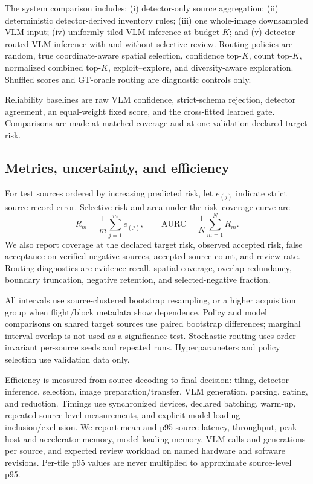 The system comparison includes: (i) detector-only source aggregation; (ii) deterministic detector-derived inventory rules; (iii) one whole-image downsampled VLM input; (iv) uniformly tiled VLM inference at budget $K$; and (v) detector-routed VLM inference with and without selective review. Routing policies are random, true coordinate-aware spatial selection, confidence top-$K$, count top-$K$, normalized combined top-$K$, exploit--explore, and diversity-aware exploration. Shuffled scores and GT-oracle routing are diagnostic controls only.

Reliability baselines are raw VLM confidence, strict-schema rejection, detector agreement, an equal-weight fixed score, and the cross-fitted learned gate. Comparisons are made at matched coverage and at one validation-declared target risk.

\subsection{Metrics, uncertainty, and efficiency}
For test sources ordered by increasing predicted risk, let $e_{(j)}$ indicate strict source-record error. Selective risk and area under the risk--coverage curve are
\begin{equation}
R_m=\frac{1}{m}\sum_{j=1}^{m}e_{(j)},\qquad
\mathrm{AURC}=\frac{1}{N}\sum_{m=1}^{N}R_m.
\label{eq:aurc}
\end{equation}
We also report coverage at the declared target risk, observed accepted risk, false acceptance on verified negative sources, accepted-source count, and review rate. Routing diagnostics are evidence recall, spatial coverage, overlap redundancy, boundary truncation, negative retention, and selected-negative fraction.

All intervals use source-clustered bootstrap resampling, or a higher acquisition group when flight/block metadata show dependence. Policy and model comparisons on shared target sources use paired bootstrap differences; marginal interval overlap is not used as a significance test. Stochastic routing uses order-invariant per-source seeds and repeated runs. Hyperparameters and policy selection use validation data only.

Efficiency is measured from source decoding to final decision: tiling, detector inference, selection, image preparation/transfer, VLM generation, parsing, gating, and reduction. Timings use synchronized devices, declared batching, warm-up, repeated source-level measurements, and explicit model-loading inclusion/exclusion. We report mean and p95 source latency, throughput, peak host and accelerator memory, model-loading memory, VLM calls and generations per source, and expected review workload on named hardware and software revisions. Per-tile p95 values are never multiplied to approximate source-level p95.

